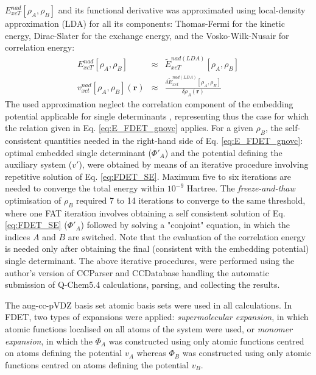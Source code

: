 \documentclass[journal=jctcce,manuscript=article]{achemso}
\begin{document}
$E_{xcT}^{nad}[\rho_A,\rho_B]$ and its functional derivative was approximated using local-density approximation (LDA) for all its components: Thomas-Fermi  \cite{Thomas1927, Fermi1928} for the kinetic energy, Dirac-Slater\cite{Slater1929} for the exchange energy, and the Vosko-Wilk-Nusair \cite{Vosko1980} for correlation energy:
\begin{eqnarray}
{E}_{xcT}^{nad}[\rho_A,\rho_B]&\approx& \tilde {E}_{xcT}^{nad(LDA)}[\rho_A,\rho_B] \\
v_{xct}^{nad}[\rho_A,\rho_B](\mathbf{r})&\approx&\frac{\delta \tilde{E}_{xct}^{nad(LDA)}[\rho_A,\rho_B]}{\delta\rho_A(\mathbf{r})}
\end{eqnarray}
The used approximation neglect the correlation component of the embedding potential applicable for single determinants \cite{Wesolowski2008}, representing thus the case for which the relation given in Eq. \ref{eq:E_FDET_gnovc} applies. 
For a given $\rho_B$, the self-consistent quantities needed in the right-hand side of Eq. \ref{eq:E_FDET_gnovc}: 
optimal embedded single determinant ($\Phi'_A$) and the potential defining the auxiliary system ($v'$), 
were obtained by means of an iterative procedure involving repetitive solution of Eq. \ref{eq:FDET_SE}. 
Maximum five to six iterations are needed to converge the total energy within $10^{-9}$ Hartree. 
The \textit{freeze-and-thaw} optimisation of $\rho_B$ required 7 to 14 iterations to converge to the same threshold, where
one FAT iteration involves obtaining a self consistent solution of Eq. \ref{eq:FDET_SE} ($\Phi'_A$) followed by
solving a "conjoint" equation, in which the indices $A$ and $B$ are switched. Note that the evaluation of the correlation 
energy is needed only after obtaining the final (consistent with the embedding potential) single determinant. 
The above iterative procedures, were performed using the author's version \cite{CCParser_Ricardi} of CCParser\cite{CCParser_Zech} and CCDatabase\cite{CCDatabase} handling
 the automatic submission of Q-Chem5.4\cite{Qchem54} calculations, parsing, and collecting the results.

The aug-cc-pVDZ basis set atomic basis sets were used in all calculations. 
In FDET, two types of expansions were applied: {\it supermolecular expansion}, in which atomic functions localised on all atoms of the system were used, or {\it monomer expansion}, in which the $\Phi_A$ was constructed using only 
atomic functions centred on atoms defining the potential $v_A$ whereas $\Phi_B$ was constructed using only 
atomic functions centred on atoms defining the potential $v_B$.
\end{document}
